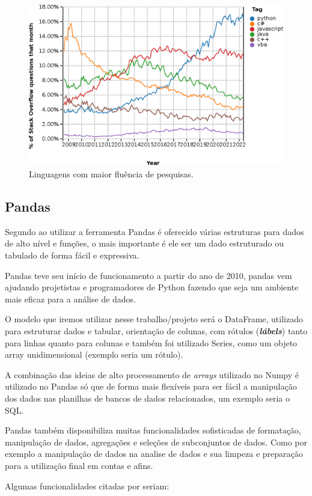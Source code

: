 \begin{figure}[h]
    \caption{\label{fig:Fig_1}Linguagens com maior fluência de pesquisas.}
    \includegraphics[width=\textwidth]{TCC_Renda/figuras/Graph1.eps}
\end{figure}

\subsection{Pandas}\label{sec:Pandas}

\par Segundo \textcite{mckinney2019} ao utilizar a ferramenta Pandas é oferecido várias estruturas para dados de alto nível e funções, o mais importante é ele ser um dado estruturado ou tabulado de forma fácil e expressiva.
\par Pandas teve seu início de funcionamento a partir do ano de 2010, pandas vem ajudando projetistas e programadores de Python fazendo que seja um ambiente mais eficaz para a análise de dados.
\par O modelo que iremos utilizar nesse trabalho/projeto será o DataFrame, utilizado para estruturar dados e tabular, orientação de colunas, com rótulos (\textit\textbf{lábels}) tanto para linhas quanto para colunas e também foi utilizado Series, como um objeto array unidimensional (exemplo seria um rótulo).
\par A combinação das ideias de alto processamento de \textit{arrays} utilizado no Numpy é utilizado no Pandas só que de forma mais flexíveis para ser fácil a manipulação dos dados nas planilhas de bancos de dados relacionados, um exemplo seria o SQL.
\par Pandas também disponibiliza muitas funcionalidades sofisticadas de formatação, manipulação de dados, agregações e seleções de subconjuntos de dados. Como por exemplo a manipulação de dados na analise de dados e sua limpeza e preparação para a utilização final em contas e afins.
\par Algumas funcionalidades citadas por \textsc{\cite[p.12]{mckinney2019}} seriam:

